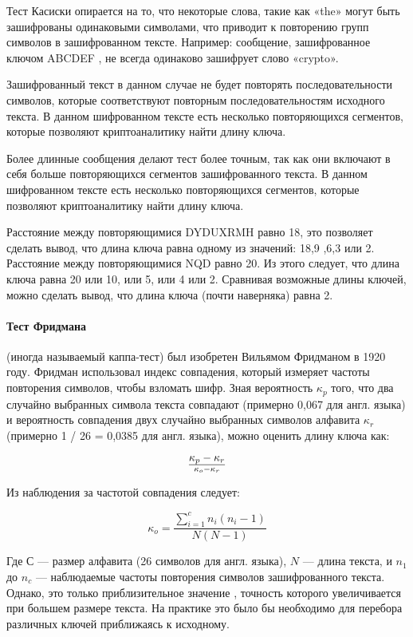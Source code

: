 Тест Касиски опирается на то, что некоторые слова, такие как 
«the» могут быть зашифрованы одинаковыми символами, что приводит 
к повторению групп символов в зашифрованном тексте. Например: 
сообщение, зашифрованное ключом ABCDEF , не всегда одинаково 
зашифрует слово «crypto».

Зашифрованный текст в данном случае не будет повторять последовательности 
символов, которые соответствуют повторным последовательностям 
исходного текста. В данном шифрованном тексте есть несколько 
повторяющихся сегментов, которые позволяют криптоаналитику найти 
длину ключа.

Более длинные сообщения делают тест более точным, так как они 
включают в себя больше повторяющихся сегментов зашифрованного 
текста. В данном шифрованном тексте есть несколько повторяющихся 
сегментов, которые позволяют криптоаналитику найти длину ключа.

Расстояние между повторяющимися DYDUXRMH равно 18, это позволяет 
сделать вывод, что длина ключа равна одному из значений: 18,9
,6,3 или 2. Расстояние между повторяющимися NQD равно 20. Из 
этого следует, что длина ключа равна 20 или 10, или 5, или 4 
или 2. Сравнивая возможные длины ключей, можно сделать вывод, 
что длина ключа (почти наверняка) равна 2.

\paragraph{Тест Фридмана}

(иногда называемый каппа-тест) был изобретен Вильямом 
Фридманом в 1920 году. Фридман использовал индекс совпадения, 
который измеряет частоты повторения символов, чтобы взломать 
шифр. Зная вероятность $\kappa_p$ того, что два случайно выбранных 
символа текста совпадают (примерно 0,067 для англ. языка) и вероятность 
совпадения двух случайно выбранных символов алфавита $\kappa_r$ 
(примерно 1 / 26 = 0,0385 для англ. языка), можно оценить длину 
ключа как:

    $${\kappa_p-\kappa_r}\over{\kappa_o-\kappa_r}$$

Из наблюдения за частотой совпадения следует:

    $$\kappa_o=\frac{\sum_{i=1}^{c}n_i(n_i -1)}{N(N-1)}$$

Где $С$ — размер алфавита (26 символов для англ. языка), $N$ — длина 
текста, и $n_1$ до $n_c$ — наблюдаемые частоты повторения символов 
зашифрованного текста. Однако, это только приблизительное значение
, точность которого увеличивается при большем размере текста. 
На практике это было бы необходимо для перебора различных ключей 
приближаясь к исходному.

